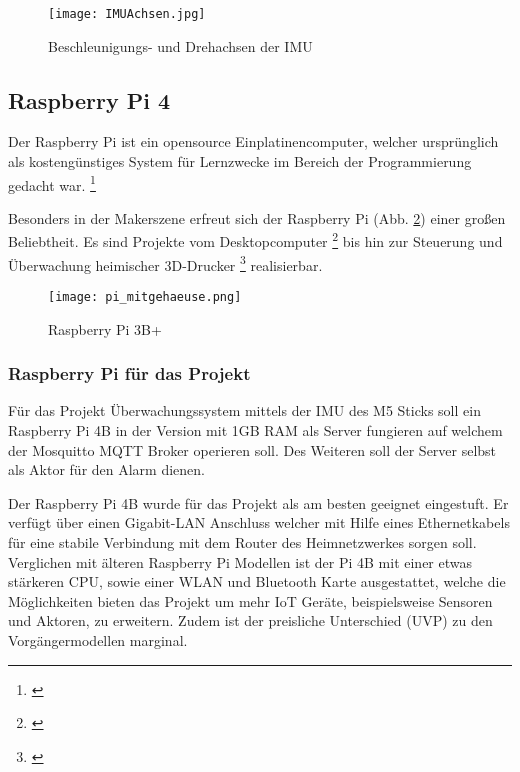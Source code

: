 \begin{figure}[H]	%
\begin{center}
\texttt{[image: IMUAchsen.jpg]}
\caption{Beschleunigungs- und Drehachsen der IMU
\protect\cite{InvenSense.}}
\label{IMUAchsen}
\end{center}
\end{figure}

\newpage

\subsection{Raspberry Pi 4}
Der Raspberry Pi ist ein opensource Einplatinencomputer, welcher ursprünglich als kostengünstiges System für Lernzwecke im Bereich der Programmierung gedacht war. \footnote{\cite{RaspberryPi.20.08.2015}} \par
Besonders in der Makerszene erfreut sich der Raspberry Pi (Abb. \ref{pi_mitgehaeuse}) einer großen Beliebtheit. Es sind Projekte vom Desktopcomputer \footnote{\cite{RaspberryPi.20.08.2015}} bis hin zur Steuerung und Überwachung heimischer 3D-Drucker \footnote{\cite{Hauge.20.04.2022}} realisierbar.\\[3mm]

	\begin{figure}[H]
	\centering
	\texttt{[image: pi\_mitgehaeuse.png]}
	\caption{Raspberry Pi 3B+}
	\label{pi_mitgehaeuse}
\end{figure}	

\subsubsection{Raspberry Pi für das Projekt}
Für das Projekt Überwachungssystem mittels der IMU des M5 Sticks soll ein 
Raspberry Pi 4B in der Version mit 1GB RAM als Server fungieren auf welchem der Mosquitto MQTT Broker operieren soll. Des Weiteren soll der Server selbst als Aktor für den Alarm dienen.\par
Der Raspberry Pi 4B wurde für das Projekt als am besten geeignet eingestuft. Er verfügt über einen Gigabit-LAN Anschluss welcher mit Hilfe eines Ethernetkabels für eine stabile Verbindung mit dem Router des Heimnetzwerkes sorgen soll. Verglichen mit älteren Raspberry Pi Modellen ist der Pi 4B mit einer etwas stärkeren CPU, sowie einer WLAN und Bluetooth Karte ausgestattet, welche die Möglichkeiten bieten das Projekt um mehr IoT Geräte, beispielsweise Sensoren und Aktoren, zu erweitern. Zudem ist der preisliche Unterschied (UVP) zu den Vorgängermodellen marginal.  

